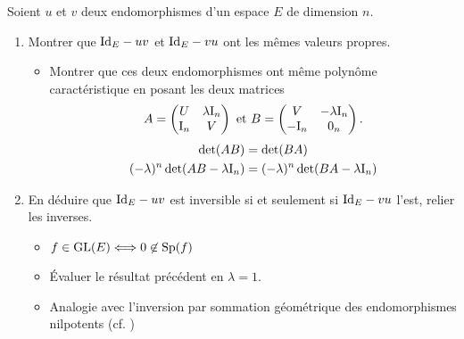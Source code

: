 Soient $u$ et $v$ deux endomorphismes d'un espace $E$ de dimension $n$.

\begin{enumerate}
    \item Montrer que $\mathrm{Id}_E-uv$ et $\mathrm{Id}_E-vu$ ont les mêmes valeurs propres.
    \begin{itemize}
        \item Montrer que ces deux endomorphismes ont même polynôme caractéristique en posant les deux matrices
        $$
        A = 
        \begin{pmatrix}
            U & \lambda \mathrm{I}_n \\
            \mathrm{I}_n & V
        \end{pmatrix}
        \text{ et }
        B = 
        \begin{pmatrix}
            V & -\lambda \mathrm{I}_n \\
            -\mathrm{I}_n & 0_n
        \end{pmatrix}.
        $$
        \begin{align*}
            \det(AB) &= \det(BA) \\
            (-\lambda)^n \det(AB - \lambda \mathrm{I}_n) &= (-\lambda)^n \det(BA - \lambda \mathrm{I}_n)
        \end{align*}
    \end{itemize}
    \item En déduire que $\mathrm{Id}_E-uv$ est inversible si et seulement si $\mathrm{Id}_E-vu$ l'est, relier les inverses. 
    \begin{itemize}
        \item $f \in \mathrm{GL}(E) \Longleftrightarrow 0 \not \in \mathrm{Sp}(f)$
        \item Évaluer le résultat précédent en $\lambda = 1$.
        \item Analogie avec l'inversion par sommation géométrique des endomorphismes nilpotents (cf. )
    \end{itemize}
\end{enumerate}